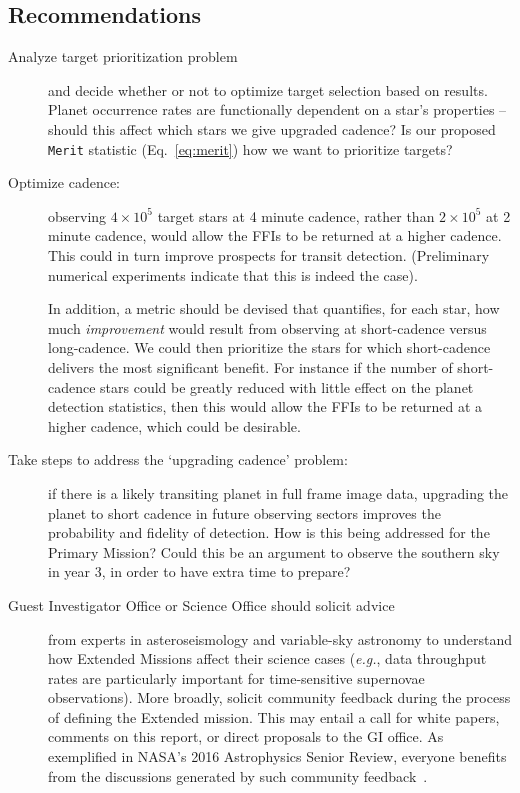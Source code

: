\subsection{Recommendations}
\label{sec:recommendations}
\begin{description}
  
	\item[Analyze target prioritization problem] and decide whether or not to optimize target selection based on results. %
	Planet occurrence rates are functionally dependent on a star's properties -- should this affect which stars we give upgraded cadence?
	Is our proposed \texttt{Merit} statistic (Eq.~\ref{eq:merit}) how we want to prioritize targets?
	
      \item[Optimize cadence:] observing $4\times10^5$ target stars at 
	      4 minute cadence, rather than $2\times10^5$ at 2 minute cadence,
	      would allow the FFIs to be returned at a higher cadence.
	      This could in turn improve prospects for transit detection.  
	      (Preliminary numerical experiments indicate that this is indeed the 
	      case).
	      
	      In addition, a metric should be devised that
        quantifies, for each star, how much {\it improvement} would
        result from observing at short-cadence versus long-cadence.
        We could then prioritize the stars for which short-cadence 
        delivers the most significant benefit. 
        For instance if the number of short-cadence stars could be 
        greatly reduced with little effect on the planet detection
        statistics, then this would allow the FFIs to be returned at a
        higher cadence, which could be desirable.
	
	\item[Take steps to address the `upgrading cadence' problem:]
          if there is a likely transiting planet in full frame image
          data, upgrading the planet to short cadence in future
          observing sectors improves the probability and fidelity of
          detection. How is this being addressed for the Primary Mission?
          Could this be an argument to observe the southern
          sky in year 3, in order to have extra time to prepare?
	
	\item[Guest Investigator Office or \tess Science Office should
          solicit advice] from experts in asteroseismology and
          variable-sky astronomy to understand how Extended Missions
          affect their science cases (\textit{e.g.}, data throughput
          rates are particularly important for time-sensitive
          supernovae observations).  More broadly, solicit community
          feedback during the process of defining the Extended
          mission.  This may entail a call for white papers, comments
          on this report, or direct proposals to the GI office.  As
          exemplified in NASA’s 2016 Astrophysics Senior Review,
          everyone benefits from the discussions generated by such
          community feedback~\citep{donahue_senior_2016}.
	

\end{description}
